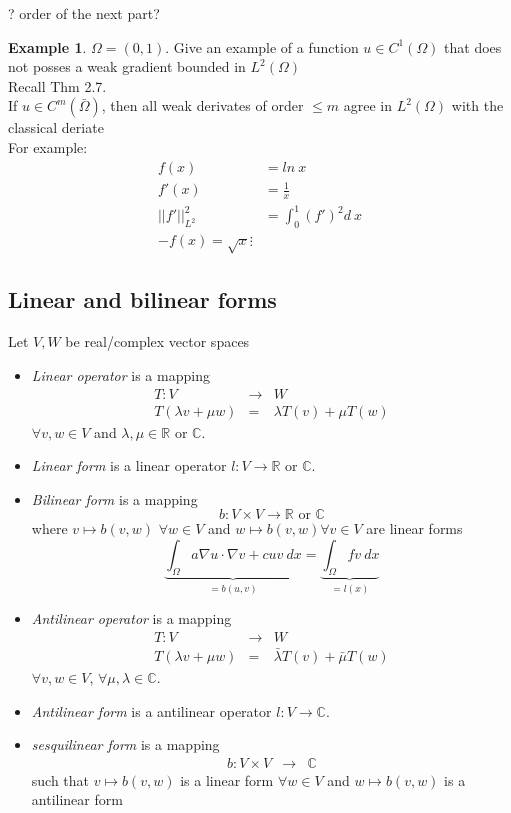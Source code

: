 \documentclass[ngerman]{article}
\theoremstyle{definition}
\newtheorem*{exa}{Example}
\theoremstyle{remark}
\newcommand{\f}[2]{\frac{#1}{#2}}							%
\newcommand{\OO}{\Omega}
\begin{document}
? order of the next part?
\begin{exa} 
  $\OO= (0,1).$ Give an example of a function $u \in C^1(\OO)$ that does not posses a weak gradient bounded in $L^2(\OO)$\\
  Recall Thm 2.7.\\
  If $u \in C^m(\bar\OO)$, then all weak derivates of order $\leq m$ agree in $L^2(\OO)$ with the classical deriate\\
  For example:
  \begin{align*}
    f(x) &= ln\ x\\
    f'(x)&=\f{1}{x}\\
    ||f'||_{L^2}^2&= \int_0 ^1 (f')^2 d\ x\\
    -f(x) = \sqrt{x}
    \vdots
  \end{align*}
\end{exa}
\subsection{Linear and bilinear forms}
Let $V,W$ be real/complex vector spaces
\begin{itemize}
\item {}\emph{Linear operator} is a mapping
  \begin{eqnarray*}
    T:V & \to & W\\
    T\left(\lambda v+\mu w\right) & = & \lambda T\left(v\right)+\mu T\left(w\right)
  \end{eqnarray*}
  $\forall v,w\in V$ and $\lambda,\mu\in\mathbb{R}$ or $\mathbb{C}$.
\item {}\emph{Linear form} is a linear operator $l:V\to\mathbb{R}$
  or $\mathbb{C}$.
\item {}\emph{Bilinear form} is a mapping
  \[
  b:V\times V\to\mathbb{R}\mbox{ or }\mathbb{C}
  \]
  where $v\mapsto b\left(v,w\right)$ $\forall w\in V$ and $w\mapsto b\left(v,w\right)\forall v\in V$
  are linear forms
  \[
  \underset{=b\left(u,v\right)}{\underbrace{\int_{\Omega}a\nabla u\cdot\nabla v+cuv\ dx}}=\underset{=l\left(x\right)}{\underbrace{\int_{\Omega}fv\ dx}}
  \]

\item {}\emph{Antilinear operator} is a mapping
  \begin{eqnarray*}
    T:V & \to & W\\
    T\left(\lambda v+\mu w\right) & = & \bar{\lambda}T\left(v\right)+\bar{\mu}T\left(w\right)
  \end{eqnarray*}
  $\forall v,w\in V$, $\forall\mu,\lambda\in\mathbb{C}$.
\item {}\emph{Antilinear form} is a antilinear operator
  $l:V\to\mathbb{C}$.
\item {}\emph{sesquilinear form} is a mapping
  \begin{eqnarray*}
    b:V\times V & \to & \mathbb{C}
  \end{eqnarray*}
  such that $v\mapsto b\left(v,w\right)$ is a linear form $\forall w\in V$
  and $w\mapsto b\left(v,w\right)$ is a antilinear form
\end{itemize}
\end{document}
